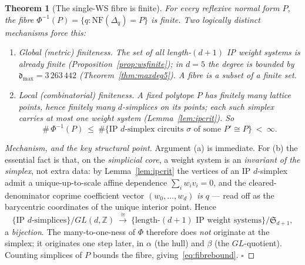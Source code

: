 \documentclass{amsart}
\newtheorem{theorem}{Theorem}[section]
\begin{document}
\begin{theorem}[The single-WS fibre is finite]\label{thm:fibrefinite}
For every reflexive normal form $P$, the fibre
$\Phi^{-1}(P)=\{q:\mathrm{NF}(\Delta_q)=P\}$ is finite. Two logically distinct
mechanisms force this:
\begin{enumerate}
  \item[\textnormal{(a)}] \emph{Global (metric) finiteness.} The set of
        \emph{all} length-$(d{+}1)$ IP weight systems is already finite
        (Proposition~\ref{prop:wsfinite}); in $d=5$ the degree is bounded by
        $\mathfrak d_{\max}=3\,263\,442$ (Theorem~\ref{thm:maxdeg5}). A fibre is
        a subset of a finite set.
  \item[\textnormal{(b)}] \emph{Local (combinatorial) finiteness.} A fixed
        polytope $P$ has finitely many lattice points, hence finitely many
        $d$-simplices on its points; each such simplex carries
        \emph{at most one} weight system (Lemma~\ref{lem:ipcrit}). So
        \begin{equation}\label{eq:fibrebound}
          \#\,\Phi^{-1}(P)\ \le\
          \#\bigl\{\text{IP }d\text{-simplex circuits } \sigma \text{ of some }
          P'\cong P\bigr\}\ <\ \infty .
        \end{equation}
\end{enumerate}
\end{theorem}

\begin{proof}[Mechanism, and the key structural point]
Argument (a) is immediate. For (b) the essential fact is that, on the
\emph{simplicial core}, a weight system is an \emph{invariant of the simplex},
not extra data: by Lemma~\ref{lem:ipcrit} the vertices of an IP $d$-simplex
admit a unique-up-to-scale affine dependence $\sum_i w_i v_i=0$, and the
cleared-denominator coprime coefficient vector $(w_0,\dots,w_d)$ \emph{is} $q$
--- read off as the barycentric coordinates of the unique interior point. Hence
\begin{equation}\label{eq:simplexws-bij}
  \{\text{IP } d\text{-simplices}\}/GL(d,\mathbb Z)
  \ \xrightarrow{\ \cong\ }\
  \{\text{length-}(d{+}1)\text{ IP weight systems}\}/\mathfrak S_{d+1},
\end{equation}
a \emph{bijection}. The many-to-one-ness of $\Phi$ therefore does \emph{not}
originate at the simplex; it originates one step later, in $\alpha$ (the hull)
and $\beta$ (the $GL$-quotient). Counting simplices of $P$ bounds the fibre,
giving~\eqref{eq:fibrebound}. $\square$
\end{proof}
\end{document}
